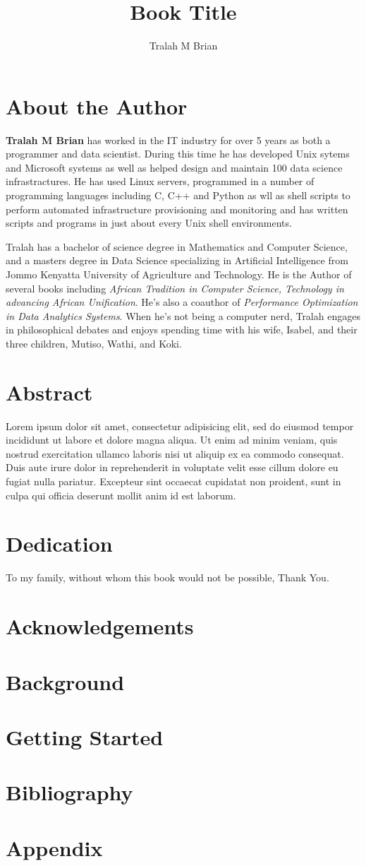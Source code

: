 \documentclass{book}
\title{Book Title}
\author{Tralah M Brian}
\begin{document}
\maketitle
\chapter*{About the Author}
\textbf{Tralah M Brian} has worked in the IT industry for over 5 years as both a
programmer and data scientist. During this time he has developed Unix sytems and
Microsoft systems as well as helped design and maintain 100 data science
infrastractures. He has used Linux servers, programmed in a number of
programming languages including C, C++ and Python as wll as shell scripts to
perform automated infrastructure provisioning and monitoring and has written
scripts and programs in just about every Unix shell environments.

Tralah has a bachelor of science degree in Mathematics and Computer Science, and
a masters degree in Data Science specializing in Artificial Intelligence from
Jommo Kenyatta University of Agriculture and Technology. He is the Author of
several books including \textit{African Tradition in Computer Science,
Technology in advancing African Unification}. He's also a coauthor of
\textit{Performance Optimization in Data Analytics Systems}. When he's not being
a computer nerd, Tralah engages in philosophical debates and enjoys spending
time with his wife, Isabel, and their three children, Mutiso, Wathi, and Koki.

\chapter*{Abstract}
Lorem ipsum dolor sit amet, consectetur adipisicing elit, sed do eiusmod tempor incididunt ut labore et dolore magna aliqua. Ut enim ad minim veniam, quis nostrud exercitation ullamco laboris nisi ut aliquip ex ea commodo consequat. Duis aute irure dolor in reprehenderit in voluptate velit esse cillum dolore eu fugiat nulla pariatur. Excepteur sint occaecat cupidatat non proident, sunt in culpa qui officia deserunt mollit anim id est laborum.
\cite{TralahTek}
\chapter*{Dedication}
To my family, without whom this book would not be possible, Thank You.
\chapter*{Acknowledgements}
\tableofcontents
\chapter{Background}
\blindtext
\chapter{Getting Started}
\blindtext
\chapter{Bibliography}
\printbibliography
\chapter*{Appendix}
\end{document}
